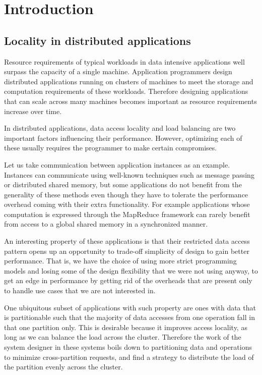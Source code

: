 \chapter{Introduction}
\label{chap:introduction}

\section{Locality in distributed applications}
Resource requirements of typical workloads in data intensive applications well surpass the
capacity of a single machine. 
Application programmers design distributed applications running on clusters of
machines to
meet the storage and computation requirements of these workloads. Therefore
designing applications that can scale across many machines becomes important as
resource requirements increase over time.

In distributed applications, data access locality and load balancing
are two important factors influencing their performance. However,
optimizing each of these usually requires the programmer to make certain
compromises.

Let us take communication between application instances as an example.
Instances can communicate using well-known techniques such as message passing
or distributed shared memory, but some applications do not benefit from the
generality of these methods even though they have to tolerate the performance
overhead coming with their extra functionality. For example applications whose
computation is expressed through the MapReduce \cite{dean2008mapreduce}
framework can rarely benefit from access to a
global shared memory in a synchronized manner.

An interesting property of these applications is that their
restricted data access pattern opens up an opportunity to trade-off simplicity
of design to gain better performance. That is, we have the choice of using more
strict programming models and losing some of the design flexibility that we
were not using anyway, to get an edge in performance by getting rid of the
overheads that are present only to handle use cases that we are not interested
in.

One ubiquitous subset of applications with such property are
ones with data that is partitionable such that the majority of data
accesses from one operation fall in that one partition only.
This is desirable because it improves access locality, as
long as we can balance the load across the cluster. Therefore the work of
the system designer in these systems boils down to partitioning data and
operations to minimize cross-partition requests, and find a strategy to
distribute the load of the partition evenly across the cluster.

